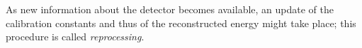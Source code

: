 As new information about the detector becomes available, an update of the
calibration constants and thus of the reconstructed energy might take place;
this procedure is called \emph{reprocessing}.

